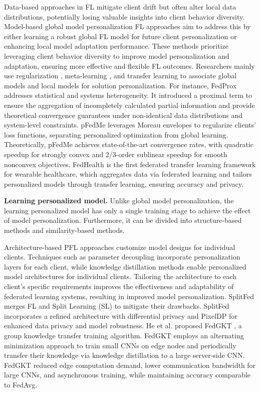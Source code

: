 \documentclass[sigconf]{acmart}
\begin{document}
Data-based approaches in FL mitigate client drift but often alter local data distributions, potentially losing valuable insights into client behavior diversity. Model-based global model personalization FL approaches aim to address this by either learning a robust global FL model for future client personalization or enhancing local model adaptation performance. These methods prioritize leveraging client behavior diversity to improve model personalization and adaptation, ensuring more effective and flexible FL outcomes. Researchers mainly use regularization \cite{acar2021federated}, meta-learning \cite{fallah2020personalized}, and transfer learning \cite{chen2020fedhealth} to associate global models and local models for solution personalization. For instance, FedProx \cite{li2020federated} addresses statistical and systems heterogeneity. It introduced a proximal term to ensure the aggregation of incompletely calculated partial information and provide theoretical convergence guarantees under non-identical data distributions and system-level constraints. pFedMe \cite{t2020personalized} leverages Moreau envelopes to regularize clients' loss functions, separating personalized optimization from global learning. Theoretically, pFedMe achieves state-of-the-art convergence rates, with quadratic speedup for strongly convex and 2/3-order sublinear speedup for smooth nonconvex objectives. FedHealth \cite{chen2020fedhealth} is the first federated transfer learning framework for wearable healthcare, which aggregates data via federated learning and tailors personalized models through transfer learning, ensuring accuracy and privacy. 
\par
\textbf{Learning personalized model.} Unlike global model personalization, the learning personalized model has only a single training stage to achieve the effect of model personalization. Furthermore, it can be divided into structure-based methods and similarity-based methods. 
\par
Architecture-based PFL approaches customize model designs for individual clients. Techniques such as parameter decoupling \cite{jin2022accelerated} incorporate personalization layers for each client, while knowledge distillation methods \cite{zhu2021data} enable personalized model architectures for individual clients. Tailoring the architecture to each client's specific requirements improves the effectiveness and adaptability of federated learning systems, resulting in improved model personalization. SplitFed \cite{thapa2022splitfed} merges FL and Split Learning (SL) to mitigate their drawbacks. SplitFed incorporates a refined architecture with differential privacy and PixelDP for enhanced data privacy and model robustness. He et al. proposed FedGKT \cite{he2020group}, a group knowledge transfer training algorithm. FedGKT employs an alternating minimization approach to train small CNNs on edge nodes and periodically transfer their knowledge via knowledge distillation to a large server-side CNN. FedGKT reduced edge computation demand, lower communication bandwidth for large CNNs, and asynchronous training, while maintaining accuracy comparable to FedAvg. 
\end{document}
